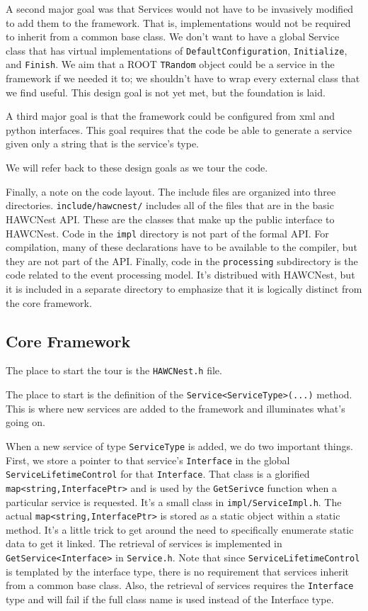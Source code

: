 \documentclass[12pt]{article}
\begin{document}
A second major goal was that Services would not have to be invasively 
modified to add them to the framework. That is, implementations 
would not be required to inherit from
a common base class. We don't want to have a global Service class that
has virtual implementations of {\tt DefaultConfiguration}, {\tt Initialize}, 
and {\tt Finish}.  
We aim that a ROOT {\tt TRandom} object could be a service in the
framework if we needed it to; we shouldn't have to wrap every external
class that we find useful.  This design goal is not yet met, but the
foundation is laid.

A third major goal is that the framework could be configured from xml and
python interfaces. This goal requires that the code be able to generate
a service given only a string that is the service's type.

We will refer back to these design goals as we tour the code.

Finally, a note on the code layout. The include files are organized into
three directories. {\tt include/hawcnest/} includes all of the files
that are in the basic HAWCNest API. These are the classes that make up
the public interface to HAWCNest. Code in the {\tt impl}
directory is not part of the formal API. For compilation, many of these
declarations have to be available to the compiler, but they are not part
of the API. Finally, code in the {\tt processing} subdirectory is the
code related to the event processing model. It's distribued with 
HAWCNest, but it is included in a separate directory to emphasize that it
is logically distinct from the core framework.

\subsection{Core Framework}

The place to start the tour is the {\tt HAWCNest.h} file. 

The place to start is the definition of the {\tt Service<ServiceType>(...)}
method. This is where new services are added to the framework and 
illuminates what's going on.

When a new service of type {\tt ServiceType} is added, we do two important
things. First, we store a pointer to that service's {\tt Interface} in the 
global
{\tt ServiceLifetimeControl} for that {\tt Interface}. 
That class is a glorified 
{\tt map<string,InterfacePtr>} and is used by the {\tt GetSerivce}
function when a particular service is requested.  
It's a small class in {\tt impl/ServiceImpl.h}. The
actual {\tt map<string,InterfacePtr>} is stored as a static object within
a static method. It's a little trick to get around the need to specifically
enumerate static data to get it linked.
The retrieval of services is implemented in {\tt GetService<Interface>}
in {\tt Service.h}. 
Note that since {\tt ServiceLifetimeControl} is templated by the interface
type, there is no requirement that services inherit from a common base class.
Also, the retrieval of services requires the {\tt Interface} type and 
will fail if the full class name is used instead of the Interface type.
\end{document}
